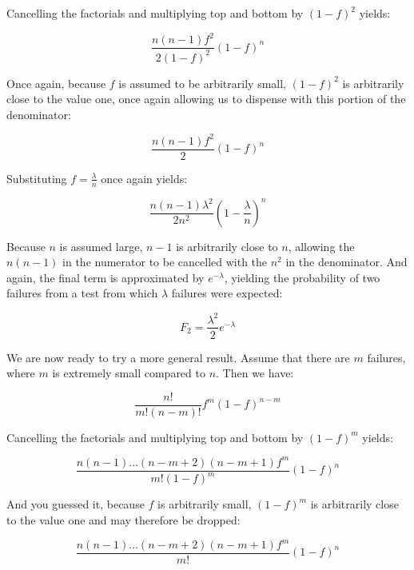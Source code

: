 Cancelling the factorials and multiplying top and bottom by
$(1-f)^2$ yields:

\begin{equation}
	\frac{n(n-1)f^2}{2(1 - f)^2}(1 - f)^n
\end{equation}

Once again, because $f$ is assumed to be arbitrarily small,
$(1-f)^2$ is arbitrarily close to the value one, once again
allowing us to dispense with this portion of the denominator:

\begin{equation}
	\frac{n(n-1)f^2}{2}(1 - f)^n
\end{equation}

Substituting $f=\frac{\lambda}{n}$ once again yields:

\begin{equation}
	\frac{n(n-1)\lambda^2}{2n^2} (1 - \frac{\lambda}{n})^n
\end{equation}

Because $n$ is assumed large, $n-1$ is arbitrarily close to $n$, allowing
the $n(n-1)$ in the numerator to be cancelled with the $n^2$ in the
denominator.
And again, the final term is approximated by $e^{-\lambda}$, yielding
the probability of two failures from a test from which $\lambda$
failures were expected:

\begin{equation}
	F_2 = \frac{\lambda^2}{2} e^{-\lambda}
\end{equation}

We are now ready to try a more general result.
Assume that there are $m$ failures, where $m$ is extremely small
compared to $n$.
Then we have:

\begin{equation}
	\frac{n!}{m!(n-m)!}f^m(1 - f)^{n-m}
\end{equation}

Cancelling the factorials and multiplying top and bottom by
$(1-f)^m$ yields:

\begin{equation}
	\frac{n(n-1)\dots(n-m+2)(n-m+1)f^m}{m!(1 - f)^m}(1 - f)^n
\end{equation}

And you guessed it, because $f$ is arbitrarily small, $(1-f)^m$ is
arbitrarily close to the value one and may therefore be dropped:

\begin{equation}
	\frac{n(n-1)\dots(n-m+2)(n-m+1)f^m}{m!}(1 - f)^n
\end{equation}

